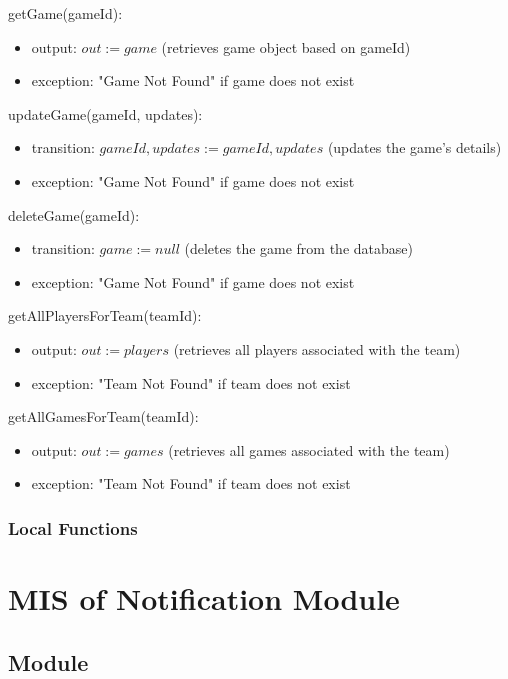 \documentclass[12pt, titlepage]{article}
\begin{document}
\noindent getGame(gameId):
\begin{itemize}
\item output: $out := game$ (retrieves game object based on gameId)
\item exception: "Game Not Found" if game does not exist
\end{itemize}

\noindent updateGame(gameId, updates):
\begin{itemize}
\item transition: $gameId, updates := gameId, updates$ (updates the game's details)
\item exception: "Game Not Found" if game does not exist
\end{itemize}

\noindent deleteGame(gameId):
\begin{itemize}
\item transition: $game := null$ (deletes the game from the database)
\item exception: "Game Not Found" if game does not exist
\end{itemize}

\noindent getAllPlayersForTeam(teamId):
\begin{itemize}
\item output: $out := players$ (retrieves all players associated with the team)
\item exception: "Team Not Found" if team does not exist
\end{itemize}

\noindent getAllGamesForTeam(teamId):
\begin{itemize}
\item output: $out := games$ (retrieves all games associated with the team)
\item exception: "Team Not Found" if team does not exist
\end{itemize}

\subsubsection{Local Functions}

\section{MIS of Notification Module} \label{Module:Notification}

\subsection{Module}
\end{document}
